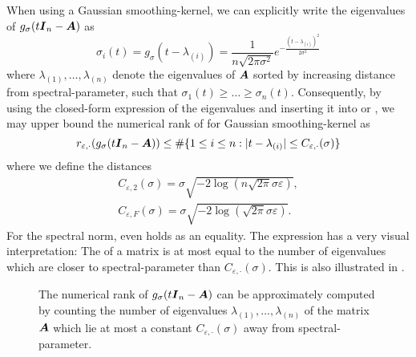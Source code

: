 When using a Gaussian \gls{smoothing-kernel}, we can explicitly write
the eigenvalues of $g_{\sigma}(t\boldsymbol{I}_n - \boldsymbol{A})$ as
\begin{equation}
    \sigma_i(t) = g_{\sigma}(t - \lambda_{(i)}) = \frac{1}{n \sqrt{2 \pi \sigma^2}} e^{-\frac{(t - \lambda_{(i)})^2}{2 \sigma^2}}
    \label{equ:3-nystrom-kernel-function-eigenvalues}
\end{equation}
where $\lambda_{(1)}, \dots, \lambda_{(n)}$ denote the
eigenvalues of $\boldsymbol{A}$ sorted by increasing
distance from \gls{spectral-parameter}, such that $\sigma_1(t) \geq \dots \geq \sigma_n(t)$.
Consequently, by using the closed-form expression of the eigenvalues 
and inserting it into  or
,
we may upper bound the numerical rank of 
for Gaussian \gls{smoothing-kernel} as
\begin{equation}
    r_{\varepsilon, \cdot}(g_{\sigma}(t\boldsymbol{I}_n - \boldsymbol{A})) \leq \#\{1\leq i\leq n: |t - \lambda_{(i)}| \leq C_{\varepsilon, \cdot}(\sigma)\}
    \label{equ:3-nystrom-kernel-numerical-rank}
\end{equation}
where we define the distances
\begin{align}
    C_{\varepsilon, 2}(\sigma) = \sigma \sqrt{-2 \log(n \sqrt{2 \pi} \sigma \varepsilon)}, \label{equ:3-nystrom-kernel-numerical-rank-spectral-constant} \\
    C_{\varepsilon, F}(\sigma) = \sigma \sqrt{-2 \log(\sqrt{2 \pi} \sigma \varepsilon)}. \label{equ:3-nystrom-kernel-numerical-rank-frobenius-constant} 
\end{align}
For the spectral norm,  even holds
as an equality.
The expression  has a very
visual interpretation: The  of a matrix is at most
equal to the number of eigenvalues which are closer to \gls{spectral-parameter}
than $C_{\varepsilon, \cdot}(\sigma)$.
This is also illustrated in .\\
\begin{figure}[ht]
    \centering
    
    \caption{The numerical rank of $g_{\sigma}(t\boldsymbol{I}_n - \boldsymbol{A})$ can be
        approximately computed by counting the number of eigenvalues
        $\lambda_{(1)}, \dots, \lambda_{(n)}$ of the matrix $\boldsymbol{A}$ which lie at most
        a constant $C_{\varepsilon, \cdot}(\sigma)$ away from \gls{spectral-parameter}.}
    \label{fig:3-nystrom-numerical-rank-constant}
\end{figure}

